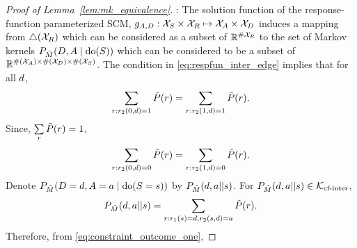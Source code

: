 \begin{proof}[Proof of Lemma~\ref{lem:mk_equivalence}]
\bm{$\mkinter \subseteq \mkiv$}: 
The solution function of the response-function parameterized SCM, $g_{A,D}: {\cal X}_{S} \times {\cal X}_{R} \mapsto {\cal X}_{A} \times {\cal X}_{D}$ induces a mapping from $\triangle{\left({{\cal X}_{R}}\right)}$ which can be considered as a subset of $\mathbb{R}^{\# {\cal X}_{R}}$ to the set of Markov kernels $P_{\tilde{M}}{\left({D,A \mid \text{do}(S)}\right)}$ which  can be considered to be a subset of $\mathbb{R}^{\#{\left({{\cal X}_{A}}\right)}\times \#{\left({{\cal X}_{D}}\right)}\times \#{\left({{\cal X}_{S}}\right)}}$.
The condition in \eqref{eq:respfun_inter_edge} implies that for all $d$,
\begin{equation}\label{eq:constraint_outcome_one}
    \sum\limits_{r: r_2{\left({0,d}\right)}=1} \tilde{P}(r) = \sum\limits_{r: r_2{\left({1,d}\right)}=1} \tilde{P}(r). 
\end{equation}
Since, $\sum\limits_{r} \tilde{P}{\left({r}\right)} = 1$, 
\begin{equation}\label{eq:constraint_outcome_zero}
    \sum\limits_{r: r_2{\left({0,d}\right)}=0} \tilde{P}(r) = \sum\limits_{r: r_2{\left({1,d}\right)}=0} \tilde{P}(r). 
\end{equation}
Denote $P_{\tilde{M}}{\left({D = d, A = a \mid \text{do}(S = s)}\right)} $ by $P_{\tilde{M}}{\left({d,a || s}\right)}$. For  $P_{\tilde{M}}{\left({d,a || s}\right)} \in {\cal K}_{\text{cf-inter}}$,
\begin{equation*}
    P_{\tilde{M}}{\left({d,a || s}\right)} = \sum\limits_{r: r_1{\left({s}\right)}=d, r_2{\left({s,d}\right)} = a
    } \tilde{P}(r). 
\end{equation*}
Therefore, from \eqref{eq:constraint_outcome_one}, 

\end{proof}
